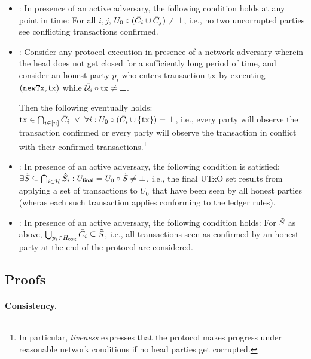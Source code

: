 \begin{itemize}
\item {}: In presence of an active adversary, the
  following condition holds at any point in time:
   For all $i,j$,
   $U_{0} \circ (\bar{C}_i \cup \bar{C}_j) \not= \bot$, i.e., no two
   uncorrupted parties see conflicting transactions confirmed.

  \item {}:
    Consider any protocol execution in presence of a network adversary wherein
    the head does not get closed for a sufficiently long period of time, and consider
    an honest party $p_i$ who enters transaction $\mathrm{tx}$ by executing $(\mathtt{newTx},\mathrm{tx})$
    while $\bar {\mathcal U}_i\circ\mathrm{tx}\not=\bot$.

    Then the following eventually holds:
    $\tx \in \bigcap_{i\in[n]} \Tbar_i\ \vee\ %
    \forall i: \Uinit \circ (\Tbar_i\cup\{\tx\}) = \bot$,
    i.e., every party will observe the transaction confirmed or every party
    will observe the transaction in conflict with their confirmed transactions.\footnote{
      In particular, \emph{liveness} expresses that the protocol makes progress
      under reasonable network conditions if no head parties get corrupted.
    }

\item {}: In presence of an active adversary,
  the following condition is satisfied:
  $\exists \tilde{S} \subseteq \bigcap_{i \in \mathcal H} \hat{S}_i : U_{\mathsf{final}}
  = U_{0} \circ \tilde{S}\not=\bot$, i.e., the final UTxO set results
  from applying a set of transactions to $U_0$ that have been seen by
  all honest parties (wheras each such transaction applies conforming to the ledger rules).
\item {}: In presence of an active adversary,
  the following condition holds: For $\tilde{S}$ as above,
  $\bigcup_{p_i \in H_{\mathsf{cont}}} \bar{C}_i \subseteq \tilde{S}$, i.e., all
  transactions seen as confirmed by an honest party at the end of the
  protocol are considered.
\end{itemize}

\subsection{Proofs}

\paragraph{Consistency.}

